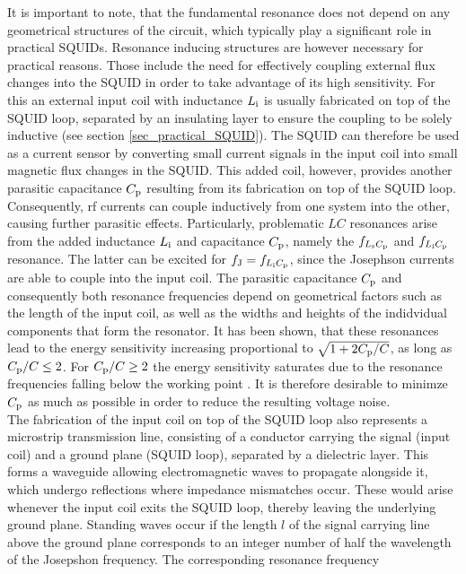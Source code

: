 It is important to note, that the fundamental resonance does not depend on any geometrical structures of the circuit, which typically play a significant role in practical SQUIDs. 
Resonance inducing structures are however necessary for practical reasons. Those include the need for effectively coupling  external flux changes into the SQUID in order to take advantage of its high sensitivity. For this an external input coil with inductance $L_{\rm i}$ is usually fabricated on top of the SQUID loop, separated by an insulating layer to ensure the coupling to be solely inductive (see section \ref{sec_practical_SQUID}). The SQUID can therefore be used as a current sensor by converting small current signals in the input coil into small magnetic flux changes in the SQUID. This added coil, however, provides another parasitic capacitance $C_{\rm p}$ resulting from its fabrication on top of the SQUID loop. Consequently, rf currents can couple inductively from one system into the other, causing further parasitic effects. Particularly, problematic $LC$ resonances arise from the added inductance $L_{\rm i}$ and capacitance $C_{\rm p}$, namely the $f_{L_{\rm s}C_{\rm p}}$ and $f_{L_{\rm i}C_{\rm p}}$ resonance. The latter can be excited for $f_{\rm J}=f_{L_{\rm i}C_{\rm p}}$, since the Josephson currents are able to couple into the input coil. The parasitic capacitance $C_{\rm p}$ and consequently both resonance frequencies depend on geometrical factors such as the length of the input coil, as well as the widths and heights of the indidvidual components that form the resonator. It has been shown, that these resonances lead to the energy sensitivity increasing proportional to $\sqrt{1+2C_{\rm p}/C}$, as long as $C_{\rm p}/C\leq 2$. For $C_{\rm p}/C\geq 2$ the energy sensitivity saturates due to the resonance frequencies falling below the working point \cite{Ryh1992}. It is therefore desirable to minimze $C_{\rm p}$ as much as possible in order to reduce the resulting voltage noise. \\

The fabrication of the input coil on top of the SQUID loop also represents a microstrip transmission line, consisting of a conductor carrying the signal (input coil) and a ground plane (SQUID loop), separated by a dielectric layer. This forms a waveguide allowing electromagnetic waves to propagate alongside it, which undergo reflections where impedance mismatches occur. These would arise whenever the input coil exits the SQUID loop, thereby leaving the underlying ground plane. Standing waves occur if the length $l$ of the signal carrying line above the ground plane corresponds to an integer number of half the wavelength of the Josepshon frequency. The corresponding resonance frequency 

